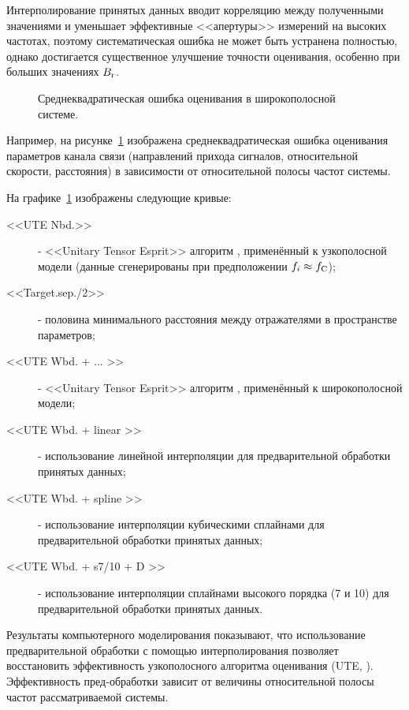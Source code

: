 Интерполирование принятых данных вводит корреляцию между полученными значениями и уменьшает эффективные <<апертуры>> измерений на высоких частотах, поэтому систематическая ошибка не может быть устранена полностью, однако достигается существенное улучшение точности оценивания, особенно при больших значениях ${{B}_{\mathrm{r}}}$. 

\begin{figure}[ht]
	\caption{Среднеквадратическая ошибка оценивания в широкополосной системе.}
	\label{fig:ch2/sec1:frac}
\end{figure}

Например, на рисунке~\ref{fig:ch2/sec1:frac} изображена среднеквадратическая ошибка оценивания параметров канала связи (направлений прихода сигналов, относительной скорости, расстояния) в зависимости от относительной полосы частот системы.

На графике~\ref{fig:ch2/sec1:frac} изображены следующие кривые:
\begin{description}
	\item[<<UTE Nbd.>>] - <<Unitary Tensor Esprit>> алгоритм \cite{Haardt08}, применённый к узкополосной модели (данные сгенерированы при предположении $f_i\approx f_{\mathrm{C}}$);
	\item[<<Target.sep./2>>] - половина минимального расстояния между отражателями в пространстве параметров;
	\item[<<UTE Wbd. + ... >>] -  <<Unitary Tensor Esprit>> алгоритм \cite{Haardt08}, применённый к широкополосной модели;
	\item[<<UTE Wbd. + linear >>] - использование линейной интерполяции для предварительной обработки принятых данных;
	\item[<<UTE Wbd. + spline >>] - использование интерполяции кубическими сплайнами для предварительной обработки принятых данных;
	\item[<<UTE Wbd. + s7/10 + D >>] - использование интерполяции сплайнами высокого порядка (7 и 10) для предварительной обработки принятых данных.
\end{description}

Результаты компьютерного моделирования показывают, что использование предварительной обработки с помощью интерполирования позволяет восстановить эффективность узкополосного алгоритма оценивания (UTE, \cite{Haardt08}). Эффективность пред-обработки зависит от величины относительной полосы частот рассматриваемой системы.

\let\pai\gpai

